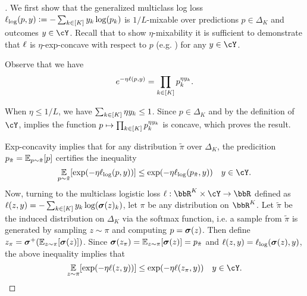 \begin{proof}[]
We first show that the generalized multiclass log loss $\ell_{\textrm{log}}(p, y)\vcentcolon=-\sum_{k\in[K]}y_{k}\log(p_k)$ is $1/L$-mixable over predictions $p \in \Delta_K$ and outcomes $y \in \cY$. Recall that to show $\eta$-mixability it is sufficient to demonstrate that $\ell$ is $\eta$-exp-concave with respect to $p$ (e.g. \citep{PLG}) for any $y \in \cY$.

Observe that we have
\[
e^{-\eta{}\ell(p,y)} = \prod_{k\in[K]}p_{k}^{\eta{}y_k}.
\]

When $\eta\leq{}1/L$, we have $\sum_{k\in[K]} \eta{}y_k\leq{}1$. Since $p \in \Delta_K$ and by the definition of $\cY$,  implies the function $p\mapsto\prod_{k\in[K]}p_{k}^{\eta{}y_k}$ is concave, which proves the result.

Exp-concavity implies that for any distribution ${\tilde{\pi}}$ over $\Delta_K$, the predicition $p_{\tilde{\pi}}=\En_{p\sim{}{\tilde{\pi}}}\brk*{p}$ certifies the inequality
\[
\En_{p \sim {\tilde{\pi}}}[\exp(-\eta{}\ls_{\textrm{log}}(p, y))] \leq \exp(-\eta\ls_{\textrm{log}}(p_{\tilde{\pi}}, y)) 
\quad{}y\in\cY.
\]
Now, turning to the multiclass logistic loss $\ls: \R^K \times \cY \rightarrow \R$ defined as $\ell(z, y) = -\sum_{k\in[K]}y_{k}\log(\boldsymbol{\sigma}(z)_{k})$, let $\pi$ be any distribution on $\R^K$. Let $\tilde{\pi}$ be the induced distribution on $\Delta_K$ via the softmax function, i.e. a sample from $\tilde{\pi}$ is generated by sampling $z \sim \pi$ and computing $p = \boldsymbol{\sigma}(z)$. Then define $z_\pi = \mb{\sigma}^{+}\prn*{\En_{z \sim \pi}\brk*{\mb{\sigma}(z)}}$. Since $\mb{\sigma}(z_\pi) = \En_{z \sim \pi}\brk*{\mb{\sigma}(z)} = p_{\tilde{\pi}}$ and $\ell(z, y) = \ell_{\textrm{log}}(\boldsymbol{\sigma}(z), y)$, the above inequality implies that
\[
\En_{z \sim \pi}[\exp(-\eta{}\ls(z, y))] \leq \exp(-\eta\ls(z_{\pi}, y)) 
\quad{}y\in\cY.
\]
\end{proof}

